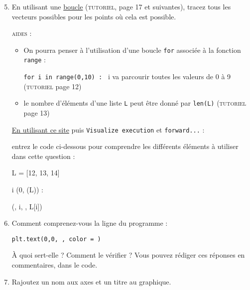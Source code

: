 \documentclass[11pt]{article}
\begin{document}
 \begin{enumerate}
 
 \setcounter{enumi}{4}
 \item En utilisant une \underline{boucle} (\textsc{tutoriel}, page 17 et suivantes), tracez tous les vecteurs possibles pour les points où cela est possible.
 
 
 \smallskip
 
 
 \textsc{aides : }
 \begin{itemize}
 \item On pourra penser à l'utilisation d'une boucle \texttt{for} associée à la fonction \texttt{range} : 
 
 \texttt{for i in range(0,10) : } i va parcourir toutes les valeurs de 0 à 9 (\textsc{tutoriel} page 12)
  \item le nombre d'éléments d'une liste \texttt{L} peut être donné par \texttt{len(L)} (\textsc{tutoriel} page 13)
 \end{itemize}

 
 \href{http://www.pythontutor.com/visualize.html\#mode=display}{En utilisant ce site} puis \texttt{Visualize execution} et \texttt{forward...} : 
 
 entrez le code ci-dessous pour comprendre les différents éléments à utiliser dans cette question : 
 
 
 
 \begin{center}
\begin{python}{0.7}
  L = [12, 13, 14]
  
  \for i \dans \range(0, \len(L)) : 
  
  \tabis \print(, i, , L[i])
 \end{python}             \end{center}

 
 
 
 
 
 \smallskip
 
 
 \item Comment comprenez-vous la ligne du programme : 
 
 \texttt{plt.text(0,0, , color = )}
 
 
 À quoi sert-elle ? Comment le vérifier ? Vous pouvez rédiger ces réponses en commentaires, dans le code.
 
 
 
 \item Rajoutez un nom aux axes et un titre au graphique.

 
 \end{enumerate}
\end{document}
